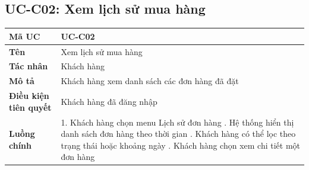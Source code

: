 \documentclass[../20232006p.tex]{subfiles}
\begin{document}
\subsection{UC-C02: Xem lịch sử mua hàng}
\begin{table}[H]
    \centering
    \begin{tabular}{|p{3.5cm}|p{10cm}|}
        \hline
        \textbf{Mã UC}                & UC-C02                                       \\
        \hline
        \textbf{Tên}                  & Xem lịch sử mua hàng                         \\
        \hline
        \textbf{Tác nhân}             & Khách hàng                                   \\
        \hline
        \textbf{Mô tả}                & Khách hàng xem danh sách các đơn hàng đã đặt \\
        \hline
        \textbf{Điều kiện tiên quyết} & Khách hàng đã đăng nhập                      \\
        \hline
        \textbf{Luồng chính}          &
        1. Khách hàng chọn menu Lịch sử đơn hàng \newline
        2. Hệ thống hiển thị danh sách đơn hàng theo thời gian \newline
        3. Khách hàng có thể lọc theo trạng thái hoặc khoảng ngày \newline
        4. Khách hàng chọn xem chi tiết một đơn hàng                                 \\
        \hline
    \end{tabular}
\end{table}
\end{document}
